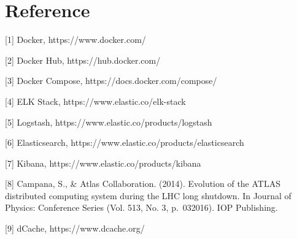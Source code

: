 \documentclass[]{article}
\begin{document}
\section{Reference}\label{reference}

{[}1{]} Docker, https://www.docker.com/

{[}2{]} Docker Hub, https://hub.docker.com/

{[}3{]} Docker Compose, https://docs.docker.com/compose/

{[}4{]} ELK Stack, https://www.elastic.co/elk-stack

{[}5{]} Logstash, https://www.elastic.co/products/logstash

{[}6{]} Elasticsearch, https://www.elastic.co/products/elasticsearch

{[}7{]} Kibana, https://www.elastic.co/products/kibana

{[}8{]} Campana, S., \& Atlas Collaboration. (2014). Evolution of the
ATLAS distributed computing system during the LHC long shutdown. In
Journal of Physics: Conference Series (Vol. 513, No. 3, p.~032016). IOP
Publishing.

{[}9{]} dCache, https://www.dcache.org/
\end{document}
